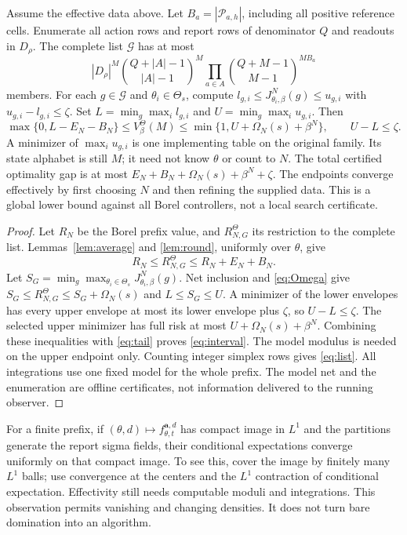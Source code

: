 \begin{theorem}\label{thm:compile}
Assume the effective data above. Let $B_a=|\mathcal P_{a,h}|$, including all positive reference cells. Enumerate all action rows and report rows of denominator $Q$ and readouts in $D_\rho$. The complete list $\mathscr G$ has at most
\begin{equation}\label{eq:list}
 |D_\rho|^M {Q+|A|-1\choose |A|-1}^{M}
       \prod_{a\in A}{Q+M-1\choose M-1}^{M B_a}
\end{equation}
members. For each $g\in\mathscr G$ and $\theta_i\in\Theta_s$, compute
$l_{g,i}\le J_{\theta_i,\beta}^{N}(g)\le u_{g,i}$ with $u_{g,i}-l_{g,i}\le\zeta$.
Set $L=\min_g\max_i l_{g,i}$ and $U=\min_g\max_i u_{g,i}$. Then
\begin{equation}\label{eq:interval}
 \boxed{\max\{0,L-E_N-B_N\}\le V_\beta^\Theta(M)
       \le\min\{1,U+\Omega_N(s)+\beta^N\},\qquad U-L\le\zeta.}
\end{equation}
A minimizer of $\max_i u_{g,i}$ is one implementing table on the original family. Its state alphabet is still $M$; it need not know $\theta$ or count to $N$. The total certified optimality gap is at most
$E_N+B_N+\Omega_N(s)+\beta^N+\zeta$.
The endpoints converge effectively by first choosing $N$ and then refining the supplied data. This is a global lower bound against all Borel controllers, not a local search certificate.
\end{theorem}
\begin{proof}
Let $R_N$ be the Borel prefix value, and $R_{N,G}^\Theta$ its restriction to the complete list. Lemmas~\ref{lem:average} and \ref{lem:round}, uniformly over $\theta$, give
\[
 R_N\le R_{N,G}^\Theta\le R_N+E_N+B_N.
\]
Let $S_G=\min_g\max_{\theta_i\in\Theta_s}J_{\theta_i,\beta}^{N}(g)$. Net inclusion and \eqref{eq:Omega} give
$S_G\le R_{N,G}^\Theta\le S_G+\Omega_N(s)$ and $L\le S_G\le U$.
A minimizer of the lower envelopes has every upper envelope at most its lower envelope plus $\zeta$, so $U-L\le\zeta$. The selected upper minimizer has full risk at most $U+\Omega_N(s)+\beta^N$. Combining these inequalities with \eqref{eq:tail} proves \eqref{eq:interval}. The model modulus is needed on the upper endpoint only. Counting integer simplex rows gives \eqref{eq:list}. All integrations use one fixed model for the whole prefix. The model net and the enumeration are offline certificates, not information delivered to the running observer.
\end{proof}

\begin{remark}\label{rem:compactdensities}
For a finite prefix, if $(\theta,d)\mapsto f_{\theta,t}^{\mathbf a,d}$ has compact image in $L^1$ and the partitions generate the report sigma fields, their conditional expectations converge uniformly on that compact image. To see this, cover the image by finitely many $L^1$ balls; use convergence at the centers and the $L^1$ contraction of conditional expectation. Effectivity still needs computable moduli and integrations. This observation permits vanishing and changing densities. It does not turn bare domination into an algorithm.
\end{remark}

